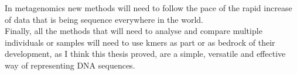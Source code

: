 In metagenomics new methods will need to follow the pace of the rapid increase of data that is being sequence everywhere in the world.\\
Finally, all the methods that will need to analyse and compare multiple individuals or samples will need to use kmers as part or as bedrock of their development, as I think this thesis proved, are a simple, versatile and effective way of representing DNA sequences.